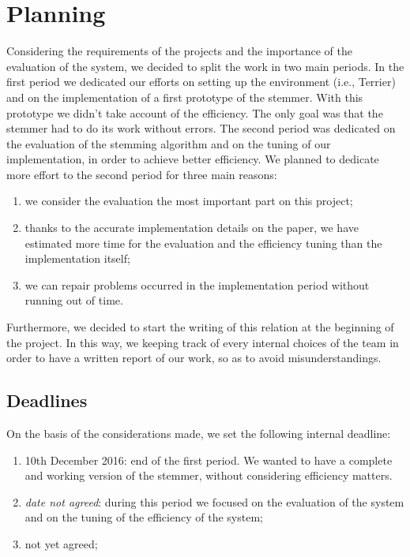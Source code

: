 \section{Planning}
    Considering the requirements of the projects and the importance of the evaluation of the system, we decided to split the work in two main periods.
    In the first period we dedicated our efforts on setting up the environment (i.e., Terrier) and on the implementation of a first prototype of the stemmer. With this prototype we didn't take account of the efficiency. The only goal was that the stemmer had to do its work without errors. The second period was dedicated on the evaluation of the stemming algorithm and on the tuning of our implementation, in order to achieve better efficiency. We planned to dedicate more effort to the second period for three main reasons:
    \begin{enumerate}
        \item we consider the evaluation the most important part on this project;
        \item thanks to the accurate implementation details on the paper, we have estimated more time for the evaluation and the efficiency tuning than the implementation itself;
        \item we can repair problems occurred in the implementation period without running out of time.
    \end{enumerate}
    Furthermore, we decided to start the writing of this relation at the beginning of the project. In this way, we keeping track of every internal choices of the team in order to have a written report of our work, so as to avoid misunderstandings.
    \subsection{Deadlines}
        On the basis of the considerations made, we set the following internal deadline:
        \begin{enumerate}[label=\textbf{D.\arabic*}]
            \item \label{firstDeadline} 10th December 2016: end of the first period. We wanted to have a complete and working version of the stemmer, without considering efficiency matters.
            \item \label{secondDeadline} \textit{date not agreed}: during this period we focused on the evaluation of the system and on the tuning of the efficiency of the system;
            \item \label{thirdDeadline} not yet agreed;
        \end{enumerate}
